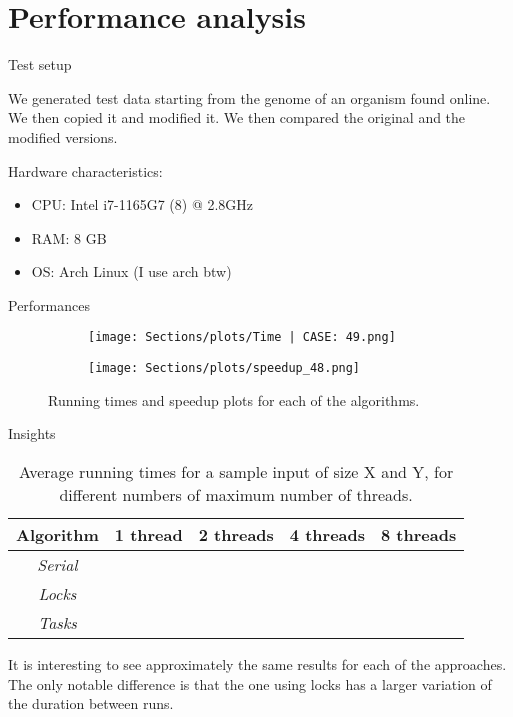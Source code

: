 

\section{Performance analysis}

    \begin{frame}{Test setup}

        We generated test data starting from the genome of an organism found online. We then copied it and modified it.
        We then compared the original and the modified versions. 

        Hardware characteristics:
        \begin{itemize}
        \item CPU: Intel i7-1165G7 (8) @ 2.8GHz
        \item RAM: 8 GB
        \item OS: Arch Linux (I use arch btw)
        \end{itemize}
        
        
    \end{frame}


    \begin{frame}{Performances}
        \begin{figure}[htbp]
            \begin{subfigure}{0.49\linewidth}
            \texttt{[image: Sections/plots/Time | CASE: 49.png]}
            \end{subfigure}
            \begin{subfigure}{0.49\textwidth}
            \texttt{[image: Sections/plots/speedup\_48.png]}
            \end{subfigure}
            \caption{Running times and speedup plots for each of the algorithms.}
        \end{figure}
        
    \end{frame}


    \begin{frame}{Insights}
        \begin{table}
        \centering
        \begin{tabular}{c|cccc}
            \textbf{Algorithm} & \textbf{1 thread} & \textbf{2 threads}& \textbf{4 threads}& \textbf{8 threads} \\
            \hline
            \textit{Serial} & \\
            \textit{Locks} & \\
            \textit{Tasks} & \\
        \end{tabular}
        \caption{Average running times for a sample input of size X and Y, for different numbers of maximum number of threads.}
        \end{table}
        
        It is interesting to see approximately the same results for each of the approaches. The only notable difference is that the one using locks has a larger variation of the duration between runs.      
        
    \end{frame}